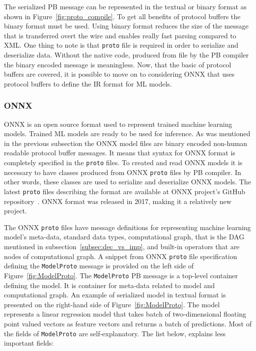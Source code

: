 \documentclass[english, 12pt, a4paper, elec, utf8, online]{aaltothesis}
\begin{document}
The serialized PB message can be represented in the textual or binary format as shown in Figure~\ref{fig:proto_compile}. To get all benefits of protocol buffers the binary format must be used. Using binary format reduces the size of the message that is transferred overt the wire and enables really fast parsing compared to XML. One thing to note is that \texttt{proto} file is required in order to serialize and deserialize data. Without the native code, produced from  file by the PB compiler the binary encoded message is meaningless.  Now, that the basic of protocol buffers are covered, it is possible to  move on to considering ONNX that uses protocol buffers to define the IR format for ML models. 

\subsubsection{ONNX}
ONNX is an open source format used to represent trained machine learning models. Trained ML models are ready to be used for inference. As was mentioned in the previous subsection the ONNX model files are binary encoded non-human readable protocol buffer messages. It means that syntax for ONNX format is completely specified in the \texttt{proto} files. To created and read ONNX models it is necessary to have classes produced from ONNX \texttt{proto} files by PB compiler. In other words, these classes are used to serialize and deserialize ONNX models. The latest \texttt{proto} files describing the format are available at ONNX project's GitHub repository~\cite{onnx_github}. ONNX format was released in 2017, making it a relatively new project. 

The ONNX \texttt{proto} files have message definitions for representing machine learning model's meta-data, standard data types, computational graph, that is the DAG mentioned in subsection~\ref{subsec:dec_vs_imp}, and built-in operators that are nodes of computational graph. A snippet from ONNX \texttt{proto} file specification defining the \texttt{ModelProto} message is provided on the left side of Figure~\ref{fig:ModelProto}. The \texttt{ModelProto} PB message is a top-level container defining the model. It is container for meta-data related to model and computational graph. An example of serialized model in textual format is presented on the right-hand side of Figure~\ref{fig:ModelProto}. The model represents a linear regression model that takes batch of two-dimensional floating point valued vectors as feature vectors and returns a batch of predictions. Most of the fields of \texttt{ModelProto} are self-explanatory. The list below, explains less important fields:
\end{document}
